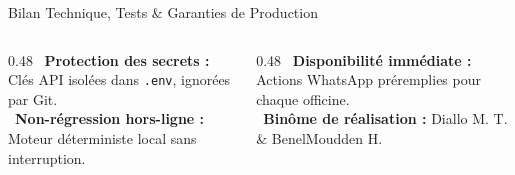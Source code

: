 \documentclass[aspectratio=169,10pt]{beamer}
\begin{document}
\begin{frame}{Bilan Technique, Tests \& Garanties de Production}
    \vspace{0.4cm}
    \begin{tcolorbox}[colback=white,colframe=darkslate,arc=2mm,title={\footnotesize \faLock~Engagements de Sécurité \& Conformité},coltitle=white]
        \scriptsize
        \begin{columns}[T]
            \begin{column}{0.48\textwidth}
                \faCheckCircle~\textbf{Protection des secrets :} Clés API isolées dans \texttt{.env}, ignorées par Git.\\
                \faCheckCircle~\textbf{Non-régression hors-ligne :} Moteur déterministe local sans interruption.
            \end{column}
            \begin{column}{0.48\textwidth}
                \faCheckCircle~\textbf{Disponibilité immédiate :} Actions WhatsApp préremplies pour chaque officine.\\
                \faCheckCircle~\textbf{Binôme de réalisation :} Diallo M. T. \& BenelMoudden H.
            \end{column}
        \end{columns}
    \end{tcolorbox}
\end{frame}
\end{document}
